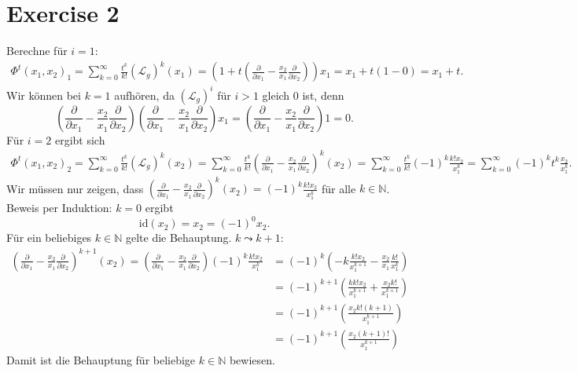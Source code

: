 \documentclass{article}
\theoremstyle{named}
\begin{document}
\section*{Exercise 2}
Berechne für $i=1$:
\begin{align*}
	\Phi^t(x_1,x_2)_1 = \sum^\infty_{k=0}\frac{t^k}{k!}(\mathcal L_g)^k(x_1) = (1 + t(\frac{\partial}{\partial x_1} - \frac{x_2}{x_1} \frac{\partial}{\partial x_2}))x_1 = x_1 +t(1- 0) = x_1 +t.
\end{align*}
Wir können bei $k = 1$ aufhören, da $(\mathcal L_g)^{i}$ für $i > 1$ gleich $0$ ist, denn 
\[
	(\frac{\partial}{\partial x_1} - \frac{x_2}{x_1} \frac{\partial}{\partial x_2})(\frac{\partial}{\partial x_1} - \frac{x_2}{x_1} \frac{\partial}{\partial x_2}) x_1 = (\frac{\partial}{\partial x_1} - \frac{x_2}{x_1} \frac{\partial}{\partial x_2}) 1 = 0.
\]
Für $i=2$ ergibt sich
\begin{align*}
	\Phi^t(x_1,x_2)_2 = \sum^\infty_{k=0}\frac{t^k}{k!}(\mathcal L_g)^k(x_2) =  \sum^\infty_{k=0}\frac{t^k}{k!}(\frac{\partial}{\partial x_1} - \frac{x_2}{x_1} \frac{\partial}{\partial x_2})^k(x_2) =  \sum^\infty_{k=0}\frac{t^k}{k!}(-1)^k\frac{k!x_2}{x_1^k} = \sum^\infty_{k=0}(-1)^kt^k\frac{x_2}{x_1^k}.
\end{align*}
Wir müssen nur zeigen, dass $(\frac{\partial}{\partial x_1} - \frac{x_2}{x_1} \frac{\partial}{\partial x_2})^k(x_2) = (-1)^k\frac{k!x_2}{x_1^k}$ für alle $k \in \mathbb N$. Beweis per Induktion: $k=0$ ergibt 
\[
	\mathrm{id}(x_2) = x_2 = (-1)^0x_2.
\]
Für ein beliebiges $k \in \mathbb N$ gelte die Behauptung. $k \leadsto k+1$: 
\begin{align*}
	(\frac{\partial}{\partial x_1} - \frac{x_2}{x_1} \frac{\partial}{\partial x_2})^{k+1}(x_2) = (\frac{\partial}{\partial x_1} - \frac{x_2}{x_1} \frac{\partial}{\partial x_2})(-1)^k\frac{k!x_2}{x_1^k} &= (-1)^k (-k \frac{k!x_2}{x_1^{k+1}} - \frac{x_2}{x_1}\frac{k!}{x_1^k}) \\
	&=(-1)^{k+1} (\frac{kk!x_2}{x_1^{k+1}} + \frac{x_2k!}{x_1^{k+1}}) \\
	&= (-1)^{k+1} (\frac{x_2k!(k+1)}{x_1^{k+1}}) \\
	&= (-1)^{k+1} (\frac{x_2(k+1)!}{x_1^{k+1}})
\end{align*}
Damit ist die Behauptung für beliebige $k \in \mathbb N$ bewiesen.
\end{document}

